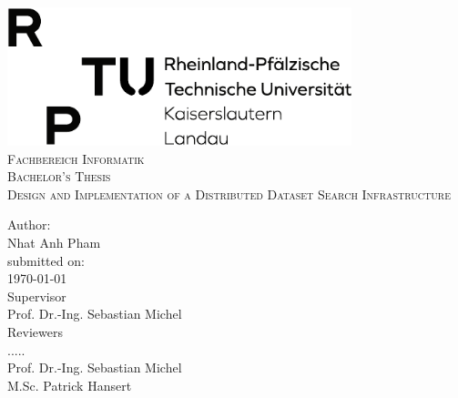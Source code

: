 \documentclass[a4paper]{report}
\author{}
\date{\today}
\begin{document}
\pagestyle{empty}
\begin{titlepage}
\begin{center}
	\includegraphics[width=10cm,clip,trim=0 0 0 0\textwidth]{rptu}\\[2cm]
  \textsc{\large Fachbereich Informatik}\\[1.5cm]
	\vfill
  \textsc{\Large Bachelor's Thesis}\\[0.5cm]
{
  \linespread{1.0}\selectfont
{\LARGE   \textsc{Design and Implementation of a Distributed Dataset Search Infrastructure}\\[2cm]}
}

  { \Large
  Author:\\
	Nhat Anh Pham\\[2cm]
  {\small submitted on: \\
  \today}
  }\\[1cm]

  Supervisor\\
Prof. Dr.-Ing. Sebastian Michel\\[2cm]

  Reviewers\\
.....\\
  Prof. Dr.-Ing. Sebastian Michel\\
  M.Sc. Patrick Hansert

  
\end{center}
\end{titlepage}

%
\cleardoublepage
\end{document}
